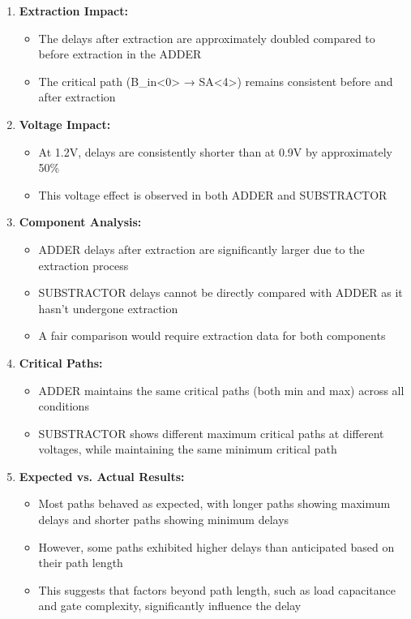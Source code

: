 \documentclass[a4paper,12pt]{article}
\begin{document}
\begin{enumerate}
    \item \textbf{Extraction Impact:}
        \begin{itemize}
            \item The delays after extraction are approximately doubled compared to before extraction in the ADDER
            \item The critical path (B\_in<0> → SA<4>) remains consistent before and after extraction
        \end{itemize}
    
    \item \textbf{Voltage Impact:}
        \begin{itemize}
            \item At 1.2V, delays are consistently shorter than at 0.9V by approximately 50\%
            \item This voltage effect is observed in both ADDER and SUBSTRACTOR
        \end{itemize}
    
    \item \textbf{Component Analysis:}
        \begin{itemize}
            \item ADDER delays after extraction are significantly larger due to the extraction process
            \item SUBSTRACTOR delays cannot be directly compared with ADDER as it hasn't undergone extraction
            \item A fair comparison would require extraction data for both components
        \end{itemize}
    
    \item \textbf{Critical Paths:}
        \begin{itemize}
            \item ADDER maintains the same critical paths (both min and max) across all conditions
            \item SUBSTRACTOR shows different maximum critical paths at different voltages, while maintaining the same minimum critical path
        \end{itemize}

    \item \textbf{Expected vs. Actual Results:}
        \begin{itemize}
            \item Most paths behaved as expected, with longer paths showing maximum delays and shorter paths showing minimum delays
            \item However, some paths exhibited higher delays than anticipated based on their path length
            \item This suggests that factors beyond path length, such as load capacitance and gate complexity, significantly influence the delay
        \end{itemize}
\end{enumerate}
\end{document}
